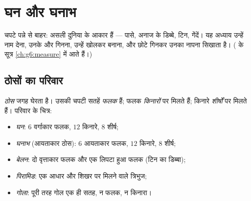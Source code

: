 \chapter{घन और घनाभ}\label{ch:g5:solids}

चपटे पन्ने से बाहर:  असली दुनिया के आकार हैं --- पासे, अनाज
के डिब्बे, टिन, गेंदें। यह अध्याय उन्हें नाम देना, उनके  और
 गिनना, उन्हें खोलकर  बनाना, और छोटे  गिनकर उनका
 नापना सिखाता है। ( के सूत्र
\cref{ch:g6:measure} में आते हैं।)

\section{ठोसों का परिवार}

\begin{definition}[ठोस और उनकी शब्दावली]\label{def:g5:solids:def}
\emph{ठोस} जगह घेरता है। उसकी चपटी सतहें
\emph{फलक} हैं; फलक \emph{किनारों} पर मिलते हैं;
किनारे \emph{शीर्षों} पर मिलते हैं। परिवार के
चित्र:
\begin{itemize}
  \item \emph{घन}: $6$ वर्गाकार फलक, $12$ किनारे,
        $8$ शीर्ष;
  \item \emph{घनाभ} (आयताकार ठोस): $6$
        आयताकार फलक, $12$ किनारे, $8$ शीर्ष;
  \item \emph{बेलन}: दो वृत्ताकार फलक और एक लिपटा हुआ फलक
        (टिन का डिब्बा);
  \item \emph{पिरामिड}: एक  आधार और शिखर पर मिलने वाले
        त्रिभुज;
  \item \emph{गोला}: पूरी तरह गोल एक ही सतह, न फलक, न
        किनारा।
\end{itemize}
\end{definition}

